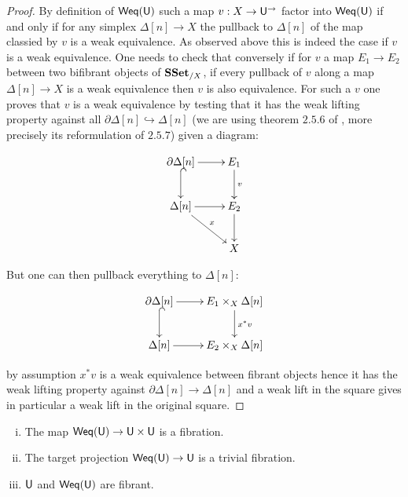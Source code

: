\documentclass[reqno,10pt,a4paper,oneside,draft]{amsart}
\begin{document}
\begin{proof}
By definition of $\mathsf{Weq}(\mathsf{U})$ such a map $v:X \rightarrow \mathsf{U}^{\rightarrow}$ factor into $\mathsf{Weq}(\mathsf{U})$ if and only if for any simplex $\Delta[n] \rightarrow X$ the pullback to $\Delta[n]$ of the map classied by $v$ is a weak equivalence. As observed above this is indeed the case if $v$ is a weak equivalence. One needs to check that conversely if for $v$ a map $E_1 \rightarrow E_2$ between two bifibrant objects of $\mathbf{SSet}_{/X}$, if every pullback of $v$ along a map $\Delta[n] \rightarrow X$ is a weak equivalence then $v$ is also equivalence.  For such a $v$ one proves that $v$ is a weak equivalence by testing that it has the weak lifting property against all $\partial \Delta[n] \hookrightarrow \Delta[n]$ (we are using theorem $2.5.6$ of \cite{henry2018wms}, more precisely its reformulation of $2.5.7$) given a diagram:


\[ \xymatrix{\partial \Delta[n] \ar[r] \ar@{^{(}->}[d] & E_1 \ar[d]^v \\
\Delta[n] \ar[r] \ar[dr]^{x}
 & E_2 \ar[d] \\
& X
} \]

But one can then pullback everything to $\Delta[n]$:

\[ \xymatrix{\partial \Delta[n] \ar[r] \ar@{^{(}->}[d] & E_1 \times_X \Delta[n] \ar[d]^{x^*v} \\
\Delta[n] \ar[r] & E_2 \times_X \Delta[n]  \\
} \]

by assumption $x^* v$ is a weak equivalence between fibrant objects hence it has the weak lifting property against $\partial \Delta[n] \rightarrow \Delta[n]$ and a weak lift in the square gives in particular a weak lift in the original square.

\end{proof}



\begin{proposition}
\leavevmode
\begin{enumerate}[(i)]

\item The map $\mathsf{Weq}(\mathsf{U}) \rightarrow \mathsf{U} \times \mathsf{U}$ is a fibration.

\item The target projection $\mathsf{Weq}(\mathsf{U}) \rightarrow \mathsf{U}$ is a trivial fibration.

\item $\mathsf{U}$ and $\mathsf{Weq}(\mathsf{U})$ are fibrant.

\end{enumerate}

\end{proposition}
\end{document}
